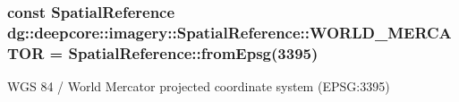 \subsubsection[{\texorpdfstring{W\+O\+R\+L\+D\+\_\+\+M\+E\+R\+C\+A\+T\+OR}{WORLD_MERCATOR}}]{\setlength{\rightskip}{0pt plus 5cm}const Spatial\+Reference dg\+::deepcore\+::imagery\+::\+Spatial\+Reference\+::\+W\+O\+R\+L\+D\+\_\+\+M\+E\+R\+C\+A\+T\+OR = Spatial\+Reference\+::from\+Epsg(3395)\hspace{0.3cm}{\ttfamily [static]}}\hypertarget{group___imagery_module_gaed40593efc83af9c4cebe9510256401b}{}\label{group___imagery_module_gaed40593efc83af9c4cebe9510256401b}


W\+GS 84 / World Mercator projected coordinate system (E\+P\+SG\+:3395) 

